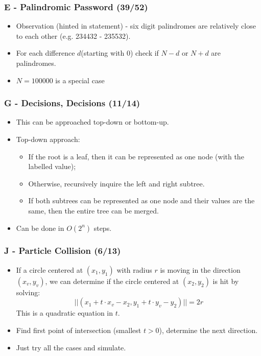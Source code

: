 \documentclass{beamer}
\begin{document}
\begin{frame}
\frametitle{E - Palindromic Password (39/52)}
\begin{itemize}
\setlength\itemsep{0.5\baselineskip}
\item Observation (hinted in statement) - six digit palindromes are relatively close to each other (e.g. 234432 - 235532).
\item For each difference $d$(starting with 0) check if $N-d$ or $N+d$ are palindromes.
\item $N=100000$ is a special case
\end{itemize}
\end{frame}

\begin{frame}
\frametitle{G - Decisions, Decisions (11/14)}
\begin{itemize}
\setlength\itemsep{0.5\baselineskip}
\item This can be approached top-down or bottom-up.
\item Top-down approach: 
  \begin{itemize}
  \item If the root is a leaf, then it can be represented as one node
    (with the labelled value);
  \item Otherwise, recursively inquire the left and right subtree.
  \item If both subtrees can be represented as one node and their values
    are the same, then the entire tree can be merged.
  \end{itemize}
\item Can be done in $O(2^n)$ steps.
\end{itemize}
\end{frame}


\begin{frame}
\frametitle{J - Particle Collision (6/13)}
\begin{itemize}
\setlength\itemsep{0.5\baselineskip}
\item If a circle centered at $(x_1,y_1)$ with radius $r$ is moving in
  the direction $(x_v, y_v)$, we can determine if the circle centered at
  $(x_2, y_2)$ is hit by solving:
  \[ || (x_1 + t\cdot x_v - x_2, y_1 + t\cdot y_v - y_2) || = 2r \]
  This is a quadratic equation in $t$.
\item Find first point of intersection (smallest $t > 0$), determine the
  next direction.
\item Just try all the cases and simulate.
\end{itemize}
\end{frame}
\end{document}
